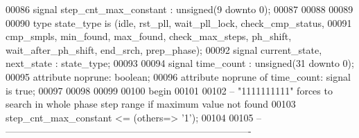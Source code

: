 \begin{DoxyCode}
00086 \textcolor{keywordflow}{signal} \textcolor{vhdlchar}{step_cnt_max_constant}           \textcolor{vhdlchar}{:} \textcolor{comment}{unsigned}\textcolor{vhdlchar}{(}\textcolor{vhdllogic}{}\textcolor{vhdllogic}{9} \textcolor{keywordflow}{downto} \textcolor{vhdllogic}{}\textcolor{vhdllogic}{0}\textcolor{vhdlchar}{)};
00087 
00088 
00089 
00090 \textcolor{keywordflow}{type} \textcolor{vhdlchar}{state_type} \textcolor{keywordflow}{is} \textcolor{vhdlchar}{(}\textcolor{vhdlchar}{idle}\textcolor{vhdlchar}{,} \textcolor{vhdlchar}{rst\_pll}\textcolor{vhdlchar}{,} \textcolor{vhdlchar}{wait\_pll\_lock}\textcolor{vhdlchar}{,} \textcolor{vhdlchar}{check\_cmp\_status}\textcolor{vhdlchar}{,} 
00091 \textcolor{vhdlchar}{cmp\_smpls}\textcolor{vhdlchar}{,} \textcolor{vhdlchar}{min\_found}\textcolor{vhdlchar}{,} \textcolor{vhdlchar}{max\_found}\textcolor{vhdlchar}{,} \textcolor{vhdlchar}{check\_max\_steps}\textcolor{vhdlchar}{,} \textcolor{vhdlchar}{ph\_shift}\textcolor{vhdlchar}{,} \textcolor{vhdlchar}{wait\_after\_ph\_shift}\textcolor{vhdlchar}{,} \textcolor{vhdlchar}{end\_srch}\textcolor{vhdlchar}{,} \textcolor{vhdlchar}{prep\_phase}\textcolor{vhdlchar}{)};
00092 \textcolor{keywordflow}{signal} \textcolor{vhdlchar}{current_state}\textcolor{vhdlchar}{,} \textcolor{vhdlchar}{next_state} \textcolor{vhdlchar}{:} \textcolor{vhdlchar}{state_type};
00093 
00094 \textcolor{keywordflow}{signal} \textcolor{vhdlchar}{time_count}                      \textcolor{vhdlchar}{:} \textcolor{comment}{unsigned}\textcolor{vhdlchar}{(}\textcolor{vhdllogic}{}\textcolor{vhdllogic}{31} \textcolor{keywordflow}{downto} \textcolor{vhdllogic}{}\textcolor{vhdllogic}{0}\textcolor{vhdlchar}{)};
00095 \textcolor{keywordflow}{attribute} \textcolor{vhdlchar}{noprune}\textcolor{vhdlchar}{:} \textcolor{comment}{boolean};
00096 \textcolor{keywordflow}{attribute} \textcolor{vhdlchar}{noprune} \textcolor{keywordflow}{of} \textcolor{vhdlchar}{time_count}\textcolor{vhdlchar}{:} \textcolor{keywordflow}{signal} \textcolor{keywordflow}{is} \textcolor{vhdlchar}{true};
00097 
00098 
00099   
00100 \textcolor{vhdlkeyword}{begin}
00101 
00102 \textcolor{keyword}{-- "1111111111" forces to search in whole phase step range if maximum value not found}
00103 \textcolor{vhdlchar}{step_cnt_max_constant} \textcolor{vhdlchar}{<=} \textcolor{vhdlchar}{(}\textcolor{keywordflow}{others}\textcolor{vhdlchar}{=}\textcolor{vhdlchar}{>} \textcolor{vhdlchar}{'}\textcolor{vhdllogic}{}\textcolor{vhdllogic}{1}\textcolor{vhdlchar}{'}\textcolor{vhdlchar}{)};
00104 
00105 \textcolor{keyword}{-- ----------------------------------------------------------------------------}

\end{DoxyCode}
